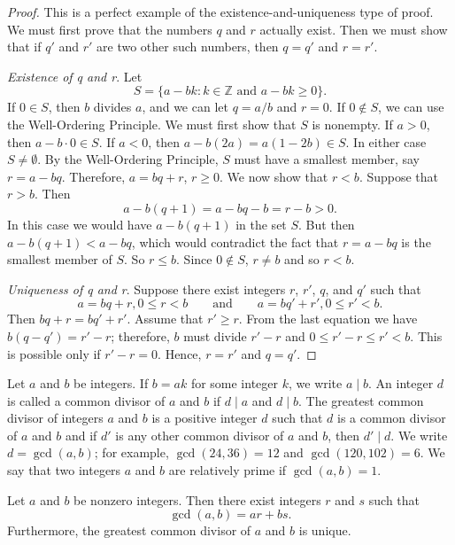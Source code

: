 \begin{proof}
This is a perfect example of the existence-and-uniqueness type of proof.  We must first prove that the numbers $q$ and $r$ actually  exist. Then we must show that if  $q'$ and $r'$ are two other such numbers, then $q = q'$ and $r = r'$. 
 
{\em Existence of q and r}.
Let
\[
S = \{ a - bk : k \in {\mathbb Z} \text{ and } a - bk \geq 0 \}.
\]
If $0 \in S$, then $b$ divides $a$, and  we can let $q = a/b$ and $r = 0$.  If $0 \notin S$, we can use the Well-Ordering Principle.  We must first show that $S$ is nonempty.  If $a > 0$, then $a - b \cdot 0 \in S$. If $a < 0$, then $a - b(2a) = a(1 - 2b) \in S$.  In either case $S \neq \emptyset$.  By the Well-Ordering Principle, $S$ must have a smallest member, say $r = a - bq$. Therefore, $a = bq + r$, $r \geq 0$. We now show that $r < b$. Suppose that $r > b$. Then   
\[
a - b(q + 1)= a - bq - b = r - b > 0.
\]
In this case we would have $a - b(q + 1)$ in the set $S$. But then $a - b(q + 1) < a - bq$, which would contradict the fact that $r = a - bq$ is the smallest member  of $S$. So $r \leq b$.  Since $0 \notin S$, $r \neq b$ and so $r < b$. 
 
{\em Uniqueness of q and r}.
Suppose there exist integers $r$, $r'$, $q$, and $q'$ such that
\[
a = bq + r, 0 \leq r < b 
\qquad
\text{and}
\qquad
a = bq' + r', 0 \leq r' < b.
\]
Then $ bq + r =  bq' + r'$.  Assume that $r' \geq r$.  From the last equation we have $b(q - q') = r' - r$; therefore, $b$ must divide $r' - r$ and $0 \leq r'- r \leq r' < b$.  This is possible only if $r' - r = 0$.  Hence, $r = r'$ and  $q = q'$. 
\end{proof}

\medskip

Let $a$ and $b$ be integers.  If $b = ak$ for some integer $k$, we write $a \mid b$\label{divides}.  An integer $d$ is called a {\bfi  common divisor\/} of $a$ and $b$ if $d \mid a$ and $d \mid b$.  The {\bfi greatest common divisor\/} of integers $a$ and $b$ is a positive integer $d$ such that $d$ is a common divisor  of $a$ and $b$ and if $d'$ is any other common divisor of $a$ and $b$, then $d' \mid d$.  We write $d = \gcd(a, b)$\label{greatestcd}; for example, $\gcd( 24, 36) = 12$ and $\gcd(120, 102) = 6$.  We say that two integers $a$ and $b$ are {\bfi relatively prime\/} if $\gcd( a, b ) = 1$. 

\begin{theorem}\label{integers:gcd_theorem}
Let $a$ and $b$ be nonzero integers. Then there exist integers $r$ and $s$ such that
\[
\gcd( a, b) = ar + bs.
\]
Furthermore, the greatest common divisor of $a$ and $b$ is unique.
\end{theorem}
 
